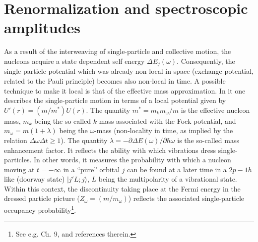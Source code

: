 \section{Renormalization and spectroscopic amplitudes}\label{S3.2}
As a result of the interweaving of single-particle and collective motion, the nucleons acquire a state dependent self energy $\Delta E_j(\omega)$.   Consequently, the single-particle potential which was already non-local in space (exchange potential, related to the Pauli principle) becomes also non-local in time. A possible technique to make it local is that of the effective mass approximation. In it  one  describes the single-particle motion in terms of a local potential  given by $U'(r)=(m/m^*)U(r)$. The quantity $m^*=m_km_\omega/m$ is the effective nucleon mass, $m_k$ being the so-called $k$-mass associated with the Fock potential, and $m_\omega=m(1+\lambda)$ being the $\omega$-mass (non-locality in time, as implied by the relation $\Delta \omega\Delta t\geq1$). The quantity  $\lambda=-\partial \Delta E(\omega)/\partial \hbar \omega$ is the so-called mass enhancement factor. It reflects the ability with which vibrations dress single-particles. In other words, it measures the probability with which a nucleon moving at  $t=-\infty$ in a ``pure'' orbital $j$ can be found at a later time in a 2$p-1h$ like (doorway state) $|j'L;j\rangle$, $L$ being the multipolarity of a vibrational state. Within this context, the discontinuity taking place at the Fermi energy in the dressed particle picture ($Z_\omega=(m/m_\omega)$) reflects the associated single-particle occupancy probability\footnote{See e.g. \cite{Brink:05} Ch. 9, and references therein.}.


